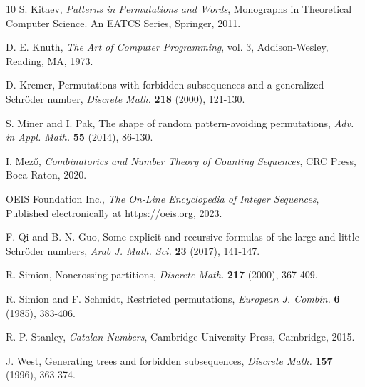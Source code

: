 \documentclass[11pt]{article}
\theoremstyle{definition}
\numberwithin{equation}{section}
\begin{document}
\begin{thebibliography}{10}
 S. Kitaev, \textit{Patterns in Permutations and Words}, Monographs in Theoretical Computer Science. An EATCS Series, Springer, 2011.

 D. E. Knuth, \textit{The Art of Computer Programming}, vol. 3, Addison-Wesley, Reading, MA, 1973.

 D. Kremer, Permutations with forbidden subsequences and a generalized Schr\"{o}der number, \textit{Discrete Math.} \textbf{218} (2000), 121-130.

 S. Miner and I. Pak, The shape of random pattern-avoiding permutations, \textit{Adv. in Appl. Math.} \textbf{55} (2014), 86-130.

 I. Mez\H{o}, \textit{Combinatorics and Number Theory of Counting Sequences}, CRC Press, Boca Raton, 2020.

 OEIS Foundation Inc., \textit{The On-Line Encyclopedia of Integer Sequences}, Published electronically at \url{https://oeis.org}, 2023.

 F. Qi and B. N. Guo, Some explicit and recursive formulas of the large and little Schr\"{o}der numbers, \textit{Arab J. Math. Sci.} \textbf{23} (2017), 141-147.

 R. Simion, Noncrossing partitions, \textit{Discrete Math.} \textbf{217} (2000), 367-409.

 R. Simion and F. Schmidt, Restricted permutations, \textit{European J. Combin.} \textbf{6} (1985), 383-406.

 R. P. Stanley, \textit{Catalan Numbers}, Cambridge University 
Press, Cambridge, 2015.

 J. West, Generating trees and forbidden subsequences, \textit{Discrete Math.} \textbf{157} (1996), 363-374.

\end{thebibliography}
\end{document}
